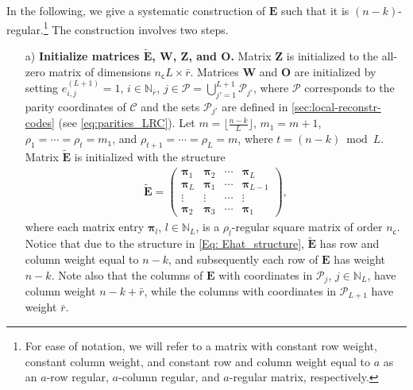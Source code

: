 \documentclass[twocolumn,conference]{IEEEtran}
\newcommand{\set}[1]{\mathcal{#1}}           %
\newcommand{\mat}[1]{\bm{#1}}                %
\newcommand{\Nat}[1]{\mathbb{N}_{#1}}        %
\newcommand{\code}[1]{\mathcal{#1}}          %
\begin{document}
In the following, we give a systematic construction of $\bm E$ such that it is $(n-k)$-regular.\footnote{For ease of notation, we will refer to a matrix with constant row weight, constant column weight, and constant row and column weight equal to $a$ as an $a$-row regular, $a$-column regular, and $a$-regular matrix, respectively.}
 The construction involves two steps.
\begin{enumerate}
\item[a)] \textbf{Initialize matrices $\tilde{\bm E}$, $\bm W$, $\bm Z$, and $\bm O$.} Matrix $\bm Z$ is
  initialized to the all-zero matrix of dimensions $n_\mathsf{c}L\times \bar r$.  Matrices $\mat{W}$ and $\mat{O}$ are
    initialized by setting $e^{(L+1)}_{i,j}=1$, $i\in\Nat{\bar r}$, $j\in\set{P}=\bigcup_{j'=1}^{L+1}\set{P}_{j'}$, where $\set{P}$
    corresponds to the parity coordinates of $\code{C}$ and the sets $\set{P}_{j'}$ are defined in
    \cref{sec:local-reconstr-codes} (see \eqref{eq:parities_LRC}). Let 
    $m=\bigl\lfloor\frac{n-k}{L}\bigr\rfloor$, $m_1= m+1$, $\rho_1=\cdots=\rho_t=m_1$, and
    $\rho_{t+1}=\cdots=\rho_{L}=m$, where $t=(n-k)\bmod L$. Matrix $\tilde{\bm E}$ is initialized with the
  structure
\begin{align}
  \label{Eq: Ehat_structure}
  \tilde{\bm E}=
\left(\begin{matrix}
      \bm \pi_1  & \bm \pi_2 & \cdots & \bm \pi_L\\
      \bm \pi_L  & \bm \pi_1 & \cdots & \bm \pi_{L-1}\\
      \vdots     & \vdots    & \cdots & \vdots\\
      \bm \pi_2  & \bm \pi_3 & \cdots & \bm \pi_1
    \end{matrix}\right),
\end{align}
where each matrix entry $\bm\pi_{l}$, $l\in\Nat{L}$, is a $\rho_l$-regular square matrix of order $n_\mathsf{c}$. Notice
that due to the structure in \cref{Eq: Ehat_structure}, $\tilde{\bm E}$  has row and column weight equal to $n-k$,
and subsequently each row of $\bm E$ has weight $n-k$. Note also that the columns of $\bm E$ with coordinates in $\mathcal P_j$, $j\in\Nat{L}$, have column weight $n-k+\bar{r}$, while the columns with coordinates in $\mathcal P_{L+1}$ have weight $\bar r$.




\end{enumerate}
\end{document}
